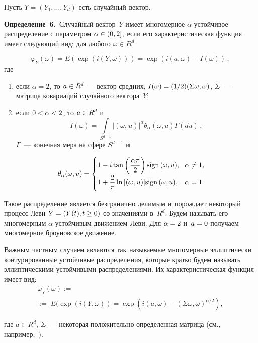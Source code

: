 \begin{multicols}{2}
\smallskip

Пусть $Y = (Y_1 , \ldots , Y_d )$ есть случайный вектор.

\smallskip

\noindent
\textbf{Определение~6.}\ Случайный вектор~$Y$ имеет многомерное $\alpha$-устой\-чи\-вое 
распределение
с параметром $\alpha\hm\in (0,2]$, если его характеристическая функция имеет следующий вид: для любого $\omega\in R^d$

\noindent
$$
\varphi_Y (\omega) = E(\exp (i (Y,\omega ))) = \exp (i (a,\omega ) - I(\omega ) )  \,,
$$
где
\begin{enumerate}[(1)]
\item если $\alpha =2$, то $a\hm\in R^d$~--- 
вектор средних, $I(\omega ) \hm= ({1}/{2}) (\Sigma\omega , \omega )$,
$\Sigma$~--- матрица ковариаций случайного вектора~$Y$;

\item если $0\hm<\alpha \hm<2$, то $a\hm\in R^d$ и
$$
I(\omega ) =    \int\limits_{S^{d-1}} |(\omega ,u)|^{\alpha} 
\theta_{\alpha} (\omega ,u) \Gamma (du)  \,,
$$
$\Gamma$~--- конечная мера на сфере $S^{d-1}$ и

\noindent
$$
\hspace*{-5mm}\theta_{\alpha} (\omega  , u ) =
 \begin{cases}
1 - i  \tan \left( \fr{\alpha \pi }{2} \right) \mathrm{sign}\, (\omega ,u),  &\! \alpha \not= 1 , \\
1 + \fr{2}{\pi} \ln |(\omega ,u) |  \mathrm{sign}\, (\omega ,u), &\! \alpha =1 .
\end{cases}
$$
\end{enumerate}

Такое распределение является безгранично
делимым и~порождает некоторый процесс Леви $Y\hm=(Y(t) , t\hm\geq 0)$ со значениями в~$R^d$. 
Будем называть его многомерным
$\alpha$-устой\-чи\-вым движением Леви. Для $\alpha \hm=2$ и~$a\hm=0$ получаем многомерное броуновское движение.

Важным частным случаем являются так называемые многомерные эллиптически 
контурированные устойчивые распределения, которые
кратко будем называть эллиптическими устойчивыми распределениями.
Их характеристическая функция имеет вид:
\begin{multline*}
\varphi_Y (\omega ) :={}\\
{}:=\; E(\exp (i (Y,\omega )) = \exp (i (a, \omega ) - 
(\Sigma\omega , \omega )^{\alpha /2} )  ,
\end{multline*}

\noindent
где $a\in R^d$, $\Sigma$~--- некоторая положительно определенная матрица (см., 
например,~\cite{No13}).




\end{multicols}
